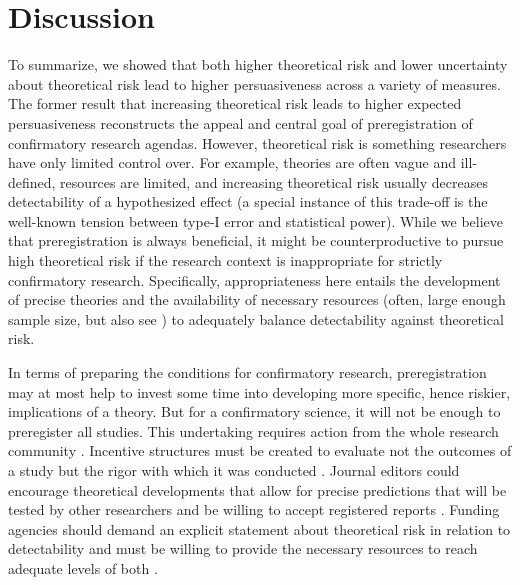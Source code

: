 \documentclass[jou,a4paper]{apa7}
\begin{document}
\section{Discussion} 

To summarize, we showed that both higher theoretical risk and lower uncertainty about theoretical risk lead to higher persuasiveness across a variety of measures.
The former result that increasing theoretical risk leads to higher expected persuasiveness reconstructs the appeal and central goal of preregistration of confirmatory research agendas.
However, theoretical risk is something researchers have only limited control over.
For example, theories are often vague and ill-defined, resources are limited, and increasing theoretical risk usually decreases detectability of a hypothesized effect (a special instance of this trade-off is the well-known tension between type-I error and statistical power).
While we believe that preregistration is always beneficial, it might be counterproductive to pursue high theoretical risk if the research context is inappropriate for strictly confirmatory research.
Specifically, appropriateness here entails the development of precise theories and the availability of necessary resources (often, large enough sample size, but also see \cite{brandmaier2015lifespan}) to adequately balance detectability against theoretical risk.\par
In terms of preparing the conditions for confirmatory research, preregistration may at most help to invest some time into developing more specific, hence riskier, implications of a theory.
But for a confirmatory science, it will not be enough to preregister all studies.
This undertaking requires action from the whole research community \parencite{lishnerConciseSetCore2015}.
Incentive structures must be created to evaluate not the outcomes of a study but the rigor with which it was conducted \parencite{caganSanFranciscoDeclaration2013,schonbrodtResponsibleResearchAssessment2022}.
Journal editors could encourage theoretical developments that allow for precise predictions that will be tested by other researchers and be willing to accept registered reports \parencite{friedLackTheoryBuilding2020,friedTheoriesModelsWhat2020,vanrooijTheoryDevelopmentRequires2020,vanrooijTheoryTestHow2021}.
Funding agencies should demand an explicit statement about theoretical risk in relation to detectability and must be willing to provide the necessary resources to reach adequate levels of both \parencite{kooleRewardingReplicationsSure2012}.\par
\end{document}
